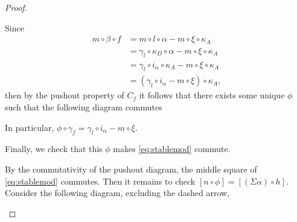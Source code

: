 \begin{proof}
\begin{enumerate}[label={(\bfseries TR\arabic*)}]
{            Since
            \begin{align*}
                m \circ \beta \circ f &= m \circ l \circ \alpha - m \circ \xi \circ \kappa_A \\
                &= \gamma_{l} \circ \kappa_{D} \circ \alpha - m \circ \xi \circ \kappa_A \\
                &= \gamma_{l} \circ i_{\alpha} \circ \kappa_A - m \circ \xi \circ \kappa_A \\
                &= (\gamma_{l} \circ i_{\alpha} - m \circ \xi) \circ \kappa_A,
            \end{align*}
            then by the pushout property of \( C_f \) it follows that there exists some unique \( \phi \) such that the following diagram commutes
            \begin{center}
            \end{center}
            In particular, \( \phi \circ \gamma_f = \gamma_{l} \circ i_{\alpha} - m \circ \xi \).

            Finally, we check that this \( \phi \) makes \autoref{eq:stablemod} commute.

            By the commutativity of the pushout diagram, the middle square of \autoref{eq:stablemod} commutes. Then it remains to check \( [n \circ \phi] = [(\Sigma \alpha) \circ h] \). Consider the following diagram, excluding the dashed arrow,
            \begin{center}
\end{center}}
\end{enumerate}
\end{proof}
